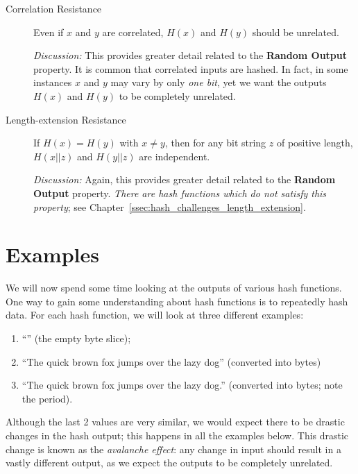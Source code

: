 \begin{description}
\item [Correlation Resistance]
    Even if $x$ and $y$ are correlated, $H(x)$ and $H(y)$
        should be unrelated.

    \emph{Discussion:} This provides greater detail related to
        the \textbf{Random Output} property.
        It is common that correlated inputs are hashed.
        In fact, in some instances $x$ and $y$ may vary by only \emph{one bit},
        yet we want the outputs $H(x)$ and $H(y)$ to be completely
        unrelated.
 \item [Length-extension Resistance]
    If $H(x) = H(y)$ with $x\ne y$, then for any bit string $z$
    of positive length, $H(x||z)$ and $H(y||z)$ are independent.

    \emph{Discussion:} Again, this provides greater detail related to
        the \textbf{Random Output} property.
    \emph{There are \glspl{hash function} which do not satisfy this property};
        see Chapter~\ref{ssec:hash_challenges_length_extension}.
\end{description}



\section{Examples}
\label{sec:hash_examples}

We will now spend some time looking at the outputs of various
\glspl{hash function}.
One way to gain some understanding about \glspl{hash function}
is to repeatedly hash data.
For each \gls{hash function}, we will look at three different examples:

\begin{enumerate}
\item ``'' (the empty byte slice);
\item ``The quick brown fox jumps over the lazy dog''
    (converted into bytes)
\item ``The quick brown fox jumps over the lazy dog.''
    (converted into bytes; note the period).
\end{enumerate}

\noindent
Although the last 2 values are very similar,
we would expect there to be drastic changes in the hash output;
this happens in all the examples below.
This drastic change is known as the \emph{avalanche effect}:
any change in input should result in a vastly different output,
as we expect the outputs to be completely unrelated.

